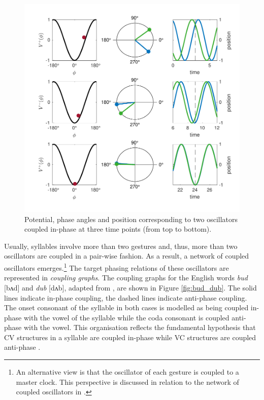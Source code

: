 \begin{figure}[htp]
\begin{center}
\includegraphics[width=\textwidth]{figures/ch3/coupled_oscillators.pdf}
\caption[Potential, phase angles and position corresponding to two oscillators coupled in-phase]{Potential, phase angles and position corresponding to two oscillators coupled in-phase at three time points (from top to bottom).}
\label{fig:coupled_oscillators}
\end{center}
\end{figure}

Usually, syllables involve more than two gestures and, thus, more than two oscillators are coupled in a pair-wise fashion. As a result, a network of coupled oscillators emerges.\footnote{An alternative view is that the oscillator of each gesture is coupled to a master clock. This perspective is discussed in relation to the network of coupled oscillators in \citet{Goldsteinetal2009}.} The target phasing relations of these oscillators are represented in \emph{coupling graphs}. The coupling graphs for the English words \emph{bud} [bʌd] and \emph{dub} [dʌb], adapted from \citet{Mücke2018}, are shown in Figure \ref{fig:bud_dub}. The solid lines indicate in-phase coupling, the dashed lines indicate anti-phase coupling. The onset consonant of the syllable in both cases is modelled as being coupled in-phase with the vowel of the syllable while the coda consonant is coupled anti-phase with the vowel. This organisation reflects the fundamental hypothesis that CV structures in a syllable are coupled in-phase while VC structures are coupled anti-phase \citep{GoldsteinByrdSaltzman2006, Goldsteinetal2009}.

